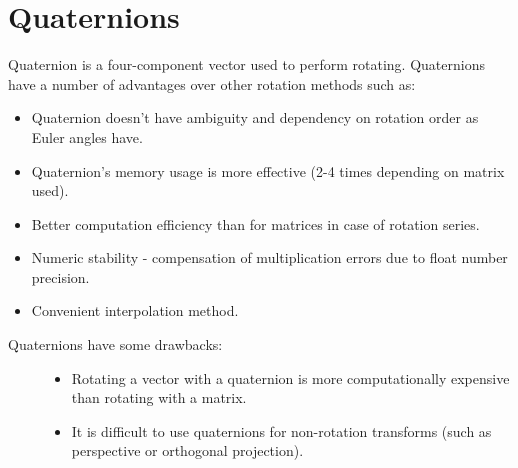 \documentclass[a4paper,12pt,oneside]{sphinxmanual}
\begin{document}

\section{Quaternions}
\label{developers:id6}\label{developers:index-0}
Quaternion is a four-component vector used to perform rotating. Quaternions have a number of advantages over other rotation methods such as:
\begin{itemize}
\item {} 
Quaternion doesn't have ambiguity and dependency on rotation order as Euler angles have.

\item {} 
Quaternion's memory usage is more effective (2-4 times depending on matrix used).

\item {} 
Better computation efficiency than for matrices in case of rotation series.

\item {} 
Numeric stability - compensation of multiplication errors due to float number precision.

\item {} 
Convenient interpolation method.

\end{itemize}
\begin{description}
\item[{Quaternions have some drawbacks:}] \leavevmode\begin{itemize}
\item {} 
Rotating a vector with a quaternion is more computationally expensive than rotating with a matrix.

\item {} 
It is difficult to use quaternions for non-rotation transforms (such as perspective or orthogonal projection).

\end{itemize}

\end{description}
\end{document}
